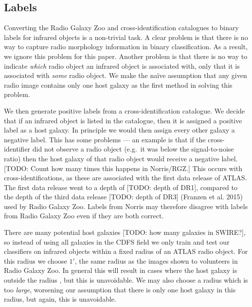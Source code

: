 \documentclass[fleqn,usenatbib,usedcolumn]{mnras}
\begin{document}
  \subsection{Labels}\label{labels}

    Converting the Radio Galaxy Zoo and \citet{norris06} cross-identification
    catalogues to binary labels for infrared objects is a non-trivial task. A
    clear problem is that there is no way to capture radio morphology
    information in binary classification. As a result, we ignore this problem
    for this paper. Another problem is that there is no way to indicate
    \emph{which} radio object an infrared object is associated with, only that
    it is associated with \emph{some} radio object. We make the na\"ive
    assumption that any given radio image contains only one host galaxy as the
    first method in solving this problem.

    We then generate positive labels from a cross-identification catalogue.
    We decide that if an infrared object is listed in the catalogue, then it
    is assigned a positive label as a host galaxy. In principle we would
    then assign every other galaxy a negative label. This has some problems
    --- an example is that if the cross-identifier did not observe a radio
    object (e.g.~it was below the signal-to-noise ratio) then the host
    galaxy of that radio object would receive a negative label. {[}TODO:
    Count how many times this happens in Norris/RGZ.{]} This occurs with
    \citet{norris06} cross-identifications, as these are associated with
    the first data release of ATLAS. The first data release went to a depth
    of {[}TODO: depth of DR1{]}, compared to the depth of the third data
    release {[}TODO: depth of DR3{]} (Franzen et al. 2015) used by Radio
    Galaxy Zoo. Labels from Norris may therefore disagree with labels from
    Radio Galaxy Zoo even if they are both correct.

    There are many potential host galaxies {[}TODO: how many galaxies in
    SWIRE?{]}, so instead of using all galaxies in the CDFS field we only
    train and test our classifiers on infrared objects within a fixed radius
    of an ATLAS radio object. For this radius we choose \(1'\), the same
    radius as the images shown to volunteers in Radio Galaxy Zoo. In general
    this will result in cases where the host galaxy is outside the radius
    \citep[e.g. the giant radio galaxy shown in][]{banfield15}, but this is
    unavoidable. We may also choose a radius which is too \emph{large},
    worsening our assumption that there is only one host galaxy in this
    radius, but again, this is unavoidable.
\end{document}
